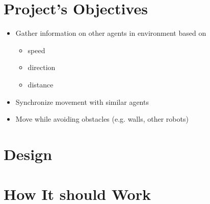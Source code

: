 \documentclass[a0,portrait]{a0poster}
\begin{document}
\begin{multicols}{2}
  \section*{Project's Objectives}
  \begin{itemize}
  \item Gather information on other agents in environment based on
    \begin{itemize}
    \item speed
    \item direction
    \item distance
    \end{itemize}
  \item Synchronize movement with similar agents
  \item Move while avoiding obstacles (e.g. walls, other robots)
  \end{itemize}

  \section*{Design}
  \begin{center}\vspace{1cm}
  \end{center}%


  \color{Black} %

  \section*{How It should Work}

  \begin{center}\vspace{1cm}
  \end{center}
  \vspace{1cm}


\end{multicols}
\end{document}
